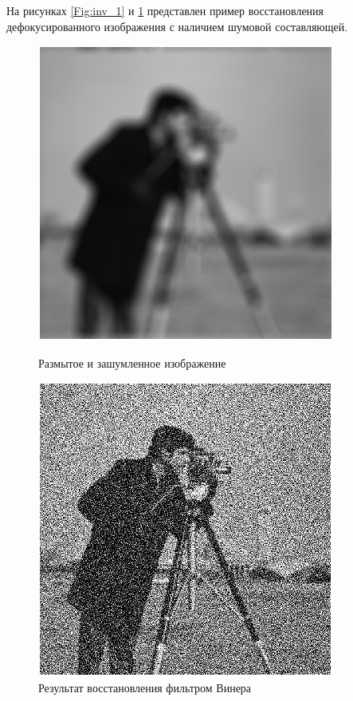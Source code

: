 На рисунках \ref{Fig:inv_1} и \ref{Fig:inv_2} представлен пример восстановления дефокусированного изображения с наличием шумовой составляющей.

\begin{figure}[!htb]
	\begin{minipage}{0.48\textwidth}
		\centering
		\includegraphics[scale=0.66]{assets/cameramen_wnr_before}
		\caption{Размытое и зашумленное изображение}\label{Fig:inv_1}
	\end{minipage}\hfill
	\begin{minipage}{0.48\textwidth}
		\centering
		\includegraphics[scale=0.65]{assets/cameramen_wnr}
		\caption{Результат восстановления фильтром Винера}\label{Fig:inv_2}
	\end{minipage}
\end{figure}

